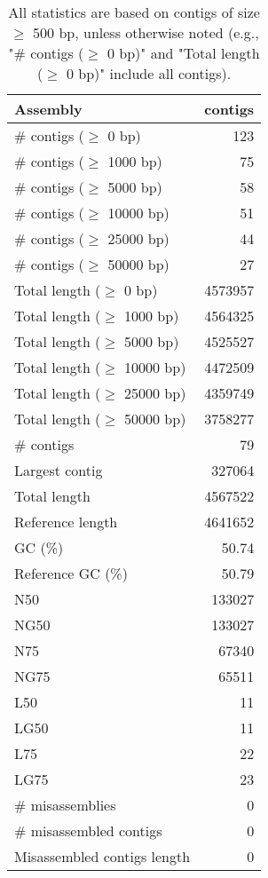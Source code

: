 \documentclass[12pt,a4paper]{article}
\begin{document}
\begin{table}[ht]
\begin{center}
\caption{All statistics are based on contigs of size $\geq$ 500 bp, unless otherwise noted (e.g., "\# contigs ($\geq$ 0 bp)" and "Total length ($\geq$ 0 bp)" include all contigs).}
\begin{tabular}{|l*{1}{|r}|}
\hline
Assembly & contigs \\ \hline
\# contigs ($\geq$ 0 bp) & 123 \\ \hline
\# contigs ($\geq$ 1000 bp) & 75 \\ \hline
\# contigs ($\geq$ 5000 bp) & 58 \\ \hline
\# contigs ($\geq$ 10000 bp) & 51 \\ \hline
\# contigs ($\geq$ 25000 bp) & 44 \\ \hline
\# contigs ($\geq$ 50000 bp) & 27 \\ \hline
Total length ($\geq$ 0 bp) & 4573957 \\ \hline
Total length ($\geq$ 1000 bp) & 4564325 \\ \hline
Total length ($\geq$ 5000 bp) & 4525527 \\ \hline
Total length ($\geq$ 10000 bp) & 4472509 \\ \hline
Total length ($\geq$ 25000 bp) & 4359749 \\ \hline
Total length ($\geq$ 50000 bp) & 3758277 \\ \hline
\# contigs & 79 \\ \hline
Largest contig & 327064 \\ \hline
Total length & 4567522 \\ \hline
Reference length & 4641652 \\ \hline
GC (\%) & 50.74 \\ \hline
Reference GC (\%) & 50.79 \\ \hline
N50 & 133027 \\ \hline
NG50 & 133027 \\ \hline
N75 & 67340 \\ \hline
NG75 & 65511 \\ \hline
L50 & 11 \\ \hline
LG50 & 11 \\ \hline
L75 & 22 \\ \hline
LG75 & 23 \\ \hline
\# misassemblies & 0 \\ \hline
\# misassembled contigs & 0 \\ \hline
Misassembled contigs length & 0 \\ \hline

\end{tabular}
\end{center}
\end{table}
\end{document}
